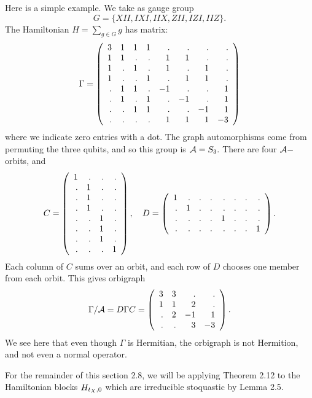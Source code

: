 Here is a simple example. %
We take as gauge group 
$$G = \{XII, IXI, IIX, ZII, IZI, IIZ\}.$$
The Hamiltonian $H = \sum_{g\in G} g$ has matrix:
$$
\Gamma = \left(\begin{array}{rrrrrrrr}
 3 &  1 &  1 &  1 &  . &  . &  . &  . \cr
  1 &  1 &  . &  . &  1 &  1 &  . &  . \cr
  1 &  . &  1 &  . &  1 &  . &  1 &  . \cr
  1 &  . &  . &  1 &  . &  1 &  1 &  . \cr
  . &  1 &  1 &  . & -1 &  . &  . &  1 \cr
  . &  1 &  . &  1 &  . & -1 &  . &  1 \cr
  . &  . &  1 &  1 &  . &  . & -1 &  1 \cr
  . &  . &  . &  . &  1 &  1 &  1 & -3
\end{array}\right)
$$
where we indicate zero entries with a dot.
The graph automorphisms come from permuting the
three qubits, and so this group is $\mathcal{A}=S_3.$
There are four $\mathcal{A}-$orbits, and
$$
C = 
\left(\begin{array}{rrrr}
 1 &  . &  . &  . \cr
  . &  1 &  . &  . \cr
  . &  1 &  . &  . \cr
  . &  1 &  . &  . \cr
  . &  . &  1 &  . \cr
  . &  . &  1 &  . \cr
  . &  . &  1 &  . \cr
  . &  . &  . &  1
\end{array}\right),\ \ \ 
D = 
\left(\begin{array}{rrrrrrrr}
 1 &  . &  . &  . &  . &  . &  . &  . \cr
  . &  1 &  . &  . &  . &  . &  . &  . \cr
  . &  . &  . &  . &  1 &  . &  . &  . \cr
  . &  . &  . &  . &  . &  . &  . &  1
\end{array}\right).
$$
Each column of $C$ sums over an orbit,
and each row of $D$ chooses one member from each orbit.
This gives orbigraph
$$
\Gamma/\mathcal{A} = D\Gamma C = \left(\begin{array}{rrrr}
 3 &  3 &  . &  . \cr
  1 &  1 &  2 &  . \cr
  . &  2 & -1 &  1 \cr
  . &  . &  3 & -3
\end{array}\right).
$$
We see here that even though $\Gamma$ is Hermitian,
the orbigraph is not Hermition, and not even a normal operator.




For the remainder of this section 2.8,
we will be applying Theorem 2.12 to the
Hamiltonian blocks $H_{t_X,0}$ which are irreducible stoquastic by 
Lemma 2.5.

%
